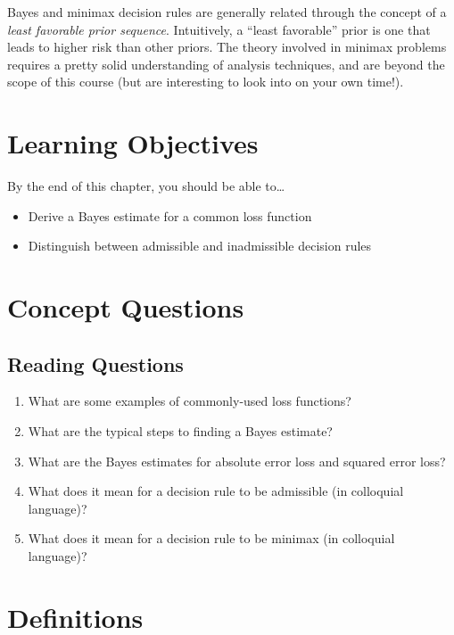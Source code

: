 \documentclass[
  letterpaper,
  DIV=11,
  numbers=noendperiod]{scrreprt}
\providecommand{\tightlist}{%
  \setlength{\itemsep}{0pt}\setlength{\parskip}{0pt}}\usepackage{longtable,booktabs,array}
\begin{document}
Bayes and minimax decision rules are generally related through the
concept of a \emph{least favorable prior sequence}. Intuitively, a
``least favorable'' prior is one that leads to higher risk than other
priors. The theory involved in minimax problems requires a pretty solid
understanding of analysis techniques, and are beyond the scope of this
course (but are interesting to look into on your own time!).

\section{Learning Objectives}\label{learning-objectives-8}

By the end of this chapter, you should be able to\ldots{}

\begin{itemize}
\tightlist
\item
  Derive a Bayes estimate for a common loss function
\item
  Distinguish between admissible and inadmissible decision rules
\end{itemize}

\section{Concept Questions}\label{concept-questions-8}

\subsection{Reading Questions}\label{reading-questions}

\begin{enumerate}
\def\labelenumi{\arabic{enumi}.}
\tightlist
\item
  What are some examples of commonly-used loss functions?
\item
  What are the typical steps to finding a Bayes estimate?
\item
  What are the Bayes estimates for absolute error loss and squared error
  loss?
\item
  What does it mean for a decision rule to be admissible (in colloquial
  language)?
\item
  What does it mean for a decision rule to be minimax (in colloquial
  language)?
\end{enumerate}

\section{Definitions}\label{definitions-8}
\end{document}
